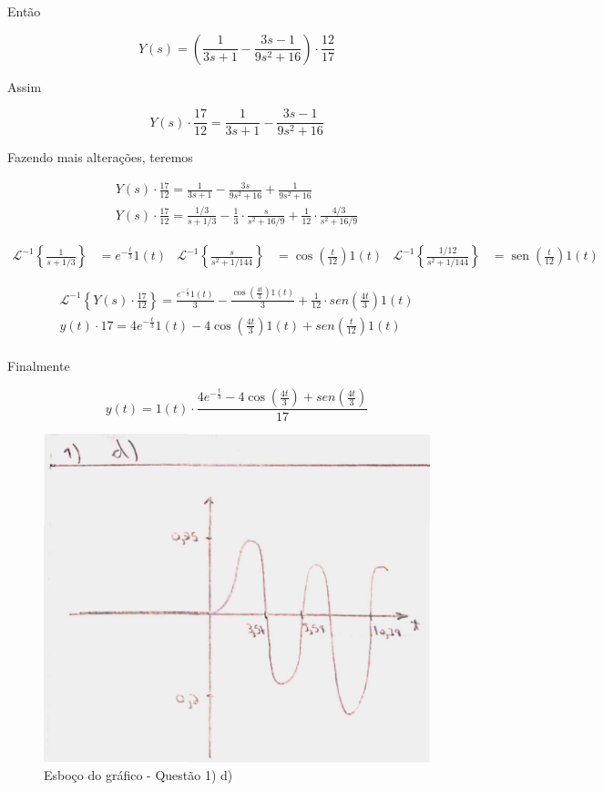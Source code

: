 \documentclass{article}
\DeclareMathOperator{\sen}{sen}
\begin{document}
Então

\[Y(s) = \left(\frac{1}{3s + 1} - \frac{3s - 1}{9s^2 + 16}\right) \cdot \frac{12}{17}\]

Assim

\[Y(s) \cdot \frac{17}{12} = \frac{1}{3s + 1} - \frac{3s - 1}{9s^2 + 16}\]

Fazendo mais alterações, teremos

\begin{align*}
    Y(s) \cdot \frac{17}{12} = \frac{1}{3s + 1} - \frac{3s}{9s^2 + 16} + \frac{1}{9s^2 + 16}\\
    Y(s) \cdot \frac{17}{12} = \frac{1/3}{s + 1/3} - \frac{1}{3}\cdot\frac{s}{s^2 + 16/9} + \frac{1}{12}\cdot\frac{4/3}{s^2 + 16/9}
\end{align*}

\begin{align*}
    \mathcal{L}^{-1} \left\{\frac{1}{s + 1/3}\right\} &= e^{-\frac{t}{3}}1(t) & \mathcal{L}^{-1} \left\{\frac{s}{s^2 + 1/144}\right\} &= \cos\left(\frac{t}{12}\right)1(t) & \mathcal{L}^{-1} \left\{\frac{1/12}{s^2 + 1/144}\right\} &= \sen\left(\frac{t}{12}\right)1(t)
\end{align*}

\begin{align*}
    \mathcal{L}^{-1} \left\{Y(s) \cdot \frac{17}{12}\right\} = \frac{e^{-\frac{t}{3}}1(t)}{3} - \frac{\cos\left(\frac{4t}{3}\right)1(t)}{3} + \frac{1}{12}\cdot sen\left(\frac{4t}{3}\right)1(t)\\
    y(t) \cdot 17 = 4e^{-\frac{t}{3}}1(t) - 4\cos\left(\frac{4t}{3}\right)1(t) + sen\left(\frac{t}{12}\right)1(t)\\
\end{align*}

Finalmente

\[y(t) = 1(t)\cdot\frac{4e^{-\frac{t}{3}} - 4\cos\left(\frac{4t}{3}\right) + sen\left(\frac{4t}{3}\right)}{17}\]

\begin{figure}[h]
    \includegraphics[scale=0.25]{Q1_d.png}
    \centering
    \caption{Esboço do gráfico - Questão 1) d)}
\end{figure}
\end{document}
